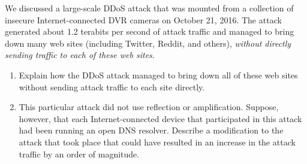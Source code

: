\newpage
{}
We discussed a large-scale DDoS attack
that was mounted from a collection of insecure Internet-connected DVR cameras on
October 21, 2016. The attack generated about 1.2 terabits per second of attack traffic
and managed to bring down
many web sites (including Twitter, Reddit, and others), {\em without directly sending
traffic to each of these web sites}. 
\begin{enumerate}
	\item Explain how the DDoS attack managed to bring down all of these web sites without
	sending attack traffic to each site directly.
	\item This particular attack did not use reflection or amplification. Suppose,
	however, that each Internet-connected device that participated in this attack had
	been running an open DNS resolver. Describe a modification to the attack that took
	place that could have resulted in an increase in the attack traffic by an order
	of magnitude.
\end{enumerate}
\eprob